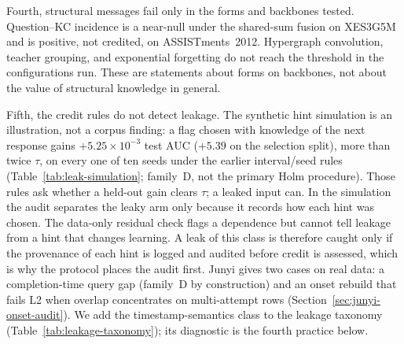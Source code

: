 \documentclass[review,12pt]{elsarticle}
\begin{document}
Fourth, structural messages fail only in the forms and backbones
tested. Question--KC incidence is a
near-null under the shared-sum fusion on XES3G5M and is
positive, not credited, on ASSISTments~2012. Hypergraph convolution,
teacher grouping, and exponential forgetting do not reach the threshold
in the configurations run. These are statements about forms on
backbones, not about the value of structural knowledge in general.

Fifth, the credit rules do not detect leakage. The synthetic hint
simulation is an illustration, not a corpus finding: a flag chosen with
knowledge of the next response gains $+5.25\times 10^{-3}$ test AUC
($+5.39$ on the selection split), more than twice $\tau$, on every one
of ten seeds under the earlier interval/seed rules
(Table~\ref{tab:leak-simulation}; family~D, not the primary Holm
procedure). Those rules ask whether a held-out gain
clears $\tau$; a leaked input can. In the simulation
the audit separates the leaky arm only because it records how each hint
was chosen. The data-only residual check flags a dependence but cannot
tell leakage from a hint that changes learning. A leak of this class is
therefore caught only if the provenance of each hint is logged and
audited before credit is assessed, which is why the protocol places the
audit first. Junyi gives two cases on real data: a completion-time
query gap (family~D by construction) and an onset rebuild that fails
L2 when overlap concentrates on multi-attempt rows
(Section~\ref{sec:junyi-onset-audit}). We add the timestamp-semantics
class to the leakage taxonomy (Table~\ref{tab:leakage-taxonomy}); its
diagnostic is the fourth practice below.
\end{document}
